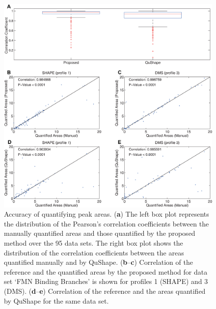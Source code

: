 \begin{figure}
\centering
\includegraphics[width=0.9\linewidth]{figures/result_peak_area4}
\caption{Accuracy of quantifying peak areas. (\textbf{a}) The left box plot represents the distribution of the Pearson's correlation coefficients between the manually quantified areas and those quantified by the proposed method over the 95 data sets. The right box plot shows the distribution of the correlation coefficients between the areas quantified manually and by QuShape. (\textbf{b}--\textbf{c}) Correlation of the reference and the quantified areas by the proposed method for data set `FMN Binding Branches' is shown for profiles 1 (SHAPE) and 3 (DMS). (\textbf{d}--\textbf{e}) Correlation of the reference and the areas quantified by QuShape for the same data set.
}
\label{f:peak-area}
\end{figure}

\newcommand{\bP}{{\mathbf{P}}}


